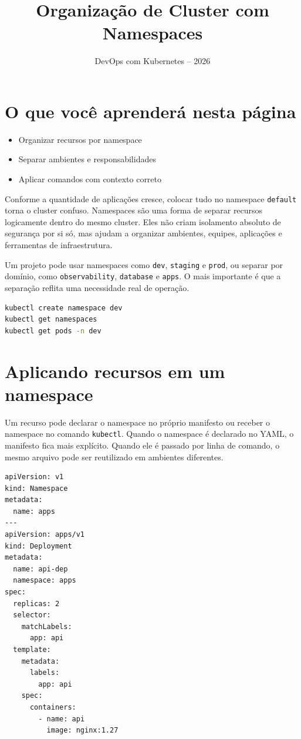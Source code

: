 \documentclass[11pt,a4paper]{article}
\title{\color{secondary}\Huge\textbf{Organização de Cluster com Namespaces}}
\author{\color{primary}DevOps com Kubernetes -- 2026}
\date{}
\begin{document}
\maketitle


\section*{\color{primary}O que você aprenderá nesta página}
\begin{itemize}
\item Organizar recursos por namespace
\item Separar ambientes e responsabilidades
\item Aplicar comandos com contexto correto
\end{itemize}

Conforme a quantidade de aplicações cresce, colocar tudo no namespace \texttt{default} torna o cluster confuso. Namespaces são uma forma de separar recursos logicamente dentro do mesmo cluster. Eles não criam isolamento absoluto de segurança por si só, mas ajudam a organizar ambientes, equipes, aplicações e ferramentas de infraestrutura.

Um projeto pode usar namespaces como \texttt{dev}, \texttt{staging} e \texttt{prod}, ou separar por domínio, como \texttt{observability}, \texttt{database} e \texttt{apps}. O mais importante é que a separação reflita uma necessidade real de operação.

\begin{lstlisting}[language=bash]
kubectl create namespace dev
kubectl get namespaces
kubectl get pods -n dev
\end{lstlisting}

\section*{\color{primary}Aplicando recursos em um namespace}

Um recurso pode declarar o namespace no próprio manifesto ou receber o namespace no comando \texttt{kubectl}. Quando o namespace é declarado no YAML, o manifesto fica mais explícito. Quando ele é passado por linha de comando, o mesmo arquivo pode ser reutilizado em ambientes diferentes.

\begin{lstlisting}[language=bash]
apiVersion: v1
kind: Namespace
metadata:
  name: apps
---
apiVersion: apps/v1
kind: Deployment
metadata:
  name: api-dep
  namespace: apps
spec:
  replicas: 2
  selector:
    matchLabels:
      app: api
  template:
    metadata:
      labels:
        app: api
    spec:
      containers:
        - name: api
          image: nginx:1.27
\end{lstlisting}
\end{document}
